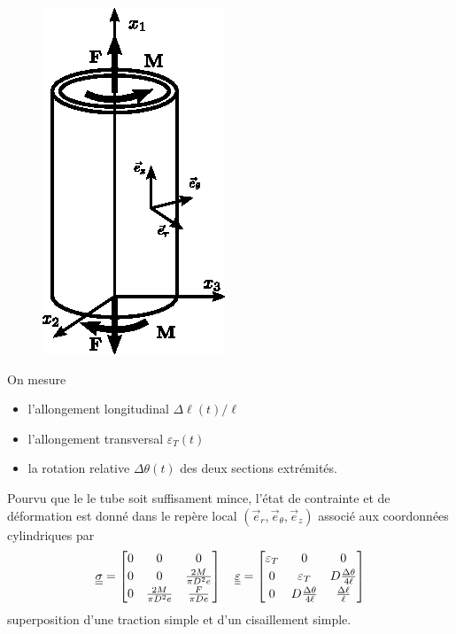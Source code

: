 \begin{figure}
    \begin{center}
        \vspace*{-5pt}
        \includegraphics{../images/T1_Ch04-0008}
    \end{center}
    \vspace*{5pt}
\end{figure}
On mesure
\begin{itemize}
    \item l'allongement longitudinal $\Delta \ell(t)/\ell$
    \item l'allongement transversal $\varepsilon_T(t)$
    \item la rotation relative $\Delta \theta(t)$ des deux sections extrémités.
\end{itemize}
Pourvu que le le tube soit suffisament mince, l'état de contrainte et de déformation est donné dans le repère local $(\vec{e}_r, \vec{e}_{\theta}, \vec{e}_z)$ associé aux coordonnées cylindriques par
\begin{equation}
    \underline{\underline{\sigma}} =
    \begin{bmatrix}
        0 & 0 & 0 \\[2pt]
        0 & 0 & \frac{2M}{\pi D^2 e} \\[2pt]
        0 & \frac{2M}{\pi D^2 e} & \frac{F}{\pi D e}
    \end{bmatrix}
    \quad
    \underline{\underline{\varepsilon}} = 
    \begin{bmatrix}
        \varepsilon_T & 0 & 0 \\[2pt]
        0 & \varepsilon_T & D \frac{\Delta \theta}{4 \ell} \\[2pt]
        0 & D \frac{\Delta \theta}{4\ell} & \frac{\Delta \ell}{\ell}
    \end{bmatrix}
    \label{eq:Ch04-036}
\end{equation}
superposition d'une traction simple et d'un cisaillement simple.

